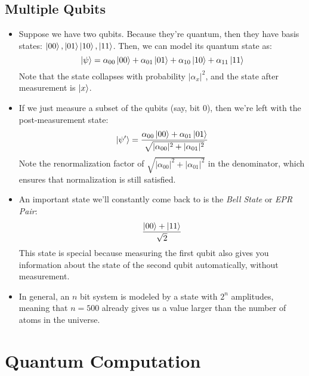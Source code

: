 \subsection{Multiple Qubits}
\begin{itemize}
	\item Suppose we have two qubits. Because they're quantum, then they have basis states: \( \ket{00}, \ket{01} 
		\ket{10}, \ket{11}\). Then, we can model its quantum state as:
		\[
		\ket{\psi} = \alpha_{00}\ket{00} + \alpha_{01}\ket{01} + \alpha_{10}\ket{10} + \alpha_{11}\ket{11}
		\] 
		Note that the state collapses with probability \( |\alpha_x|^2 \), and the state after measurement is 
		\( \ket{x} \).
	\item If we just measure a subset of the qubits (say, bit 0), then we're left with the post-measurement
		state:
		\[
		\ket{\psi'} = \frac{\alpha_{00} \ket{00} + \alpha_{01}\ket{01}}{\sqrt{|\alpha_{00}|^2 + |\alpha_{01}|^2} }
		\] 
		Note the renormalization factor of \( \sqrt{|\alpha_{00}|^2 + |\alpha_{01}|^2}  \) in the denominator,
		which ensures that normalization is still satisfied. 
	\item An important state we'll constantly come back to is the \textit{Bell State} or \textit{EPR Pair}:
		\begin{equation}\label{EPR}
			\frac{\ket{00} + \ket{11}}{\sqrt{2} }	
		\end{equation}
		This state is special because measuring the first qubit also gives you information about the state of the 
		second qubit automatically, without measurement. 
	\item In general, an \( n \) bit system is modeled by a state with \( 2^n \) amplitudes, meaning that 
		\( n = 500 \) already gives us a value larger than the number of atoms in the universe. 
\end{itemize}
\section{Quantum Computation}
